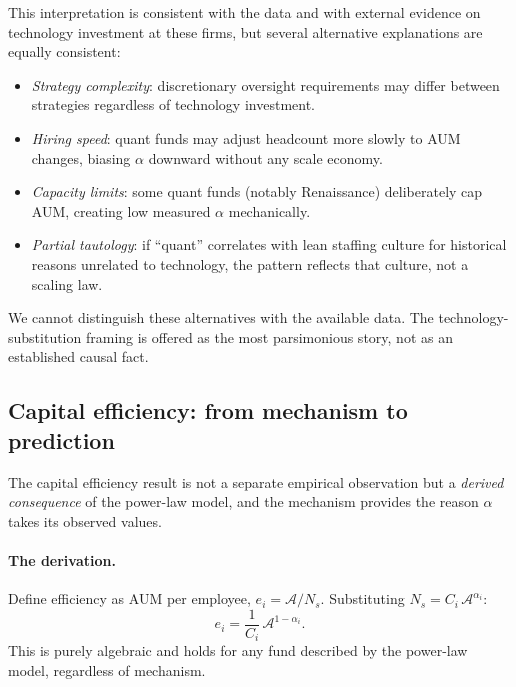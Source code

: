\documentclass[12pt]{article}
\newcommand{\Ns}{N_{s}}
\newcommand{\Ac}{\mathcal{A}}
\begin{document}
This interpretation is consistent with the data and with
external evidence on technology investment at these firms, but
several alternative explanations are equally consistent:
\begin{itemize}
  \item \emph{Strategy complexity}: discretionary oversight
        requirements may differ between strategies regardless
        of technology investment.
  \item \emph{Hiring speed}: quant funds may adjust headcount
        more slowly to AUM changes, biasing $\alpha$ downward
        without any scale economy.
  \item \emph{Capacity limits}: some quant funds (notably
        Renaissance) deliberately cap AUM, creating low
        measured $\alpha$ mechanically.
  \item \emph{Partial tautology}: if ``quant'' correlates with
        lean staffing culture for historical reasons unrelated to
        technology, the pattern reflects that culture, not a
        scaling law.
\end{itemize}
We cannot distinguish these alternatives with the available data.
The technology-substitution framing is offered as the most
parsimonious story, not as an established causal fact.

\subsection{Capital efficiency: from mechanism to prediction}
\label{sec:efficiency}

The capital efficiency result is not a separate empirical
observation but a \emph{derived consequence} of the power-law
model, and the mechanism provides the reason $\alpha$ takes its
observed values.

\paragraph{The derivation.}
Define efficiency as AUM per employee, $e_i = \Ac/\Ns$.
Substituting $\Ns = C_i\,\Ac^{\alpha_i}$:
\begin{equation}
  \label{eq:efficiency}
  e_i = \frac{1}{C_i}\,\Ac^{1-\alpha_i}.
\end{equation}
This is purely algebraic and holds for any fund described by
the power-law model, regardless of mechanism.
\end{document}
